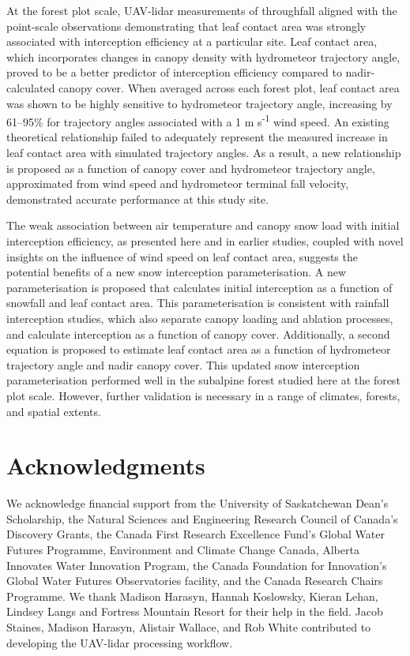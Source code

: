 \documentclass[
  letterpaper,
  DIV=11,
  numbers=noendperiod]{scrartcl}
\begin{document}
At the forest plot scale, UAV-lidar measurements of throughfall aligned
with the point-scale observations demonstrating that leaf contact area
was strongly associated with interception efficiency at a particular
site. Leaf contact area, which incorporates changes in canopy density
with hydrometeor trajectory angle, proved to be a better predictor of
interception efficiency compared to nadir-calculated canopy cover. When
averaged across each forest plot, leaf contact area was shown to be
highly sensitive to hydrometeor trajectory angle, increasing by 61--95\%
for trajectory angles associated with a 1 m s\textsuperscript{-1} wind
speed. An existing theoretical relationship failed to adequately
represent the measured increase in leaf contact area with simulated
trajectory angles. As a result, a new relationship is proposed as a
function of canopy cover and hydrometeor trajectory angle, approximated
from wind speed and hydrometeor terminal fall velocity, demonstrated
accurate performance at this study site.

The weak association between air temperature and canopy snow load with
initial interception efficiency, as presented here and in earlier
studies, coupled with novel insights on the influence of wind speed on
leaf contact area, suggests the potential benefits of a new snow
interception parameterisation. A new parameterisation is proposed that
calculates initial interception as a function of snowfall and leaf
contact area. This parameterisation is consistent with rainfall
interception studies, which also separate canopy loading and ablation
processes, and calculate interception as a function of canopy cover.
Additionally, a second equation is proposed to estimate leaf contact
area as a function of hydrometeor trajectory angle and nadir canopy
cover. This updated snow interception parameterisation performed well in
the subalpine forest studied here at the forest plot scale. However,
further validation is necessary in a range of climates, forests, and
spatial extents.

\section{Acknowledgments}\label{acknowledgments}

We acknowledge financial support from the University of Saskatchewan
Dean's Scholarship, the Natural Sciences and Engineering Research
Council of Canada's Discovery Grants, the Canada First Research
Excellence Fund's Global Water Futures Programme, Environment and
Climate Change Canada, Alberta Innovates Water Innovation Program, the
Canada Foundation for Innovation's Global Water Futures Observatories
facility, and the Canada Research Chairs Programme. We thank Madison
Harasyn, Hannah Koslowsky, Kieran Lehan, Lindsey Langs and Fortress
Mountain Resort for their help in the field. Jacob Staines, Madison
Harasyn, Alistair Wallace, and Rob White contributed to developing the
UAV-lidar processing workflow.
\end{document}
